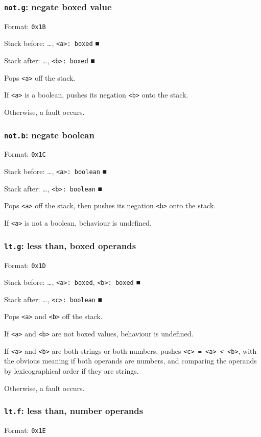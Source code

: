 \subsubsection{\texttt{not.g}: negate boxed value}
\label{sec:org4404772}
Format: \texttt{0x1B}

Stack before: \ldots{}​, \texttt{<a>: boxed} ■

Stack after: \ldots{}​, \texttt{<b>: boxed} ■

Pops \texttt{<a>} off the stack.

If \texttt{<a>} is a boolean, pushes its negation \texttt{<b>} onto the stack.

Otherwise, a fault occurs.

\subsubsection{\texttt{not.b}: negate boolean}
\label{sec:org446322c}
Format: \texttt{0x1C}

Stack before: \ldots{}​, \texttt{<a>: boolean} ■

Stack after: \ldots{}​, \texttt{<b>: boolean} ■

Pops \texttt{<a>} off the stack, then pushes its negation \texttt{<b>} onto the stack.

If \texttt{<a>} is not a boolean, behaviour is undefined.

\subsubsection{\texttt{lt.g}: less than, boxed operands}
\label{sec:org5479aa3}
Format: \texttt{0x1D}

Stack before: \ldots{}​, \texttt{<a>: boxed}, \texttt{<b>: boxed} ■

Stack after: \ldots{}​, \texttt{<c>: boolean} ■

Pops \texttt{<a>} and \texttt{<b>} off the stack.

If \texttt{<a>} and \texttt{<b>} are not boxed values, behaviour is undefined.

If \texttt{<a>} and \texttt{<b>} are both strings or both numbers, pushes
\texttt{<c> = <a> < <b>}, with the obvious meaning if both operands are
numbers, and comparing the operands by lexicographical order if they are
strings.

Otherwise, a fault occurs.

\subsubsection{\texttt{lt.f}: less than, number operands}
\label{sec:orga91f7a6}
Format: \texttt{0x1E}

